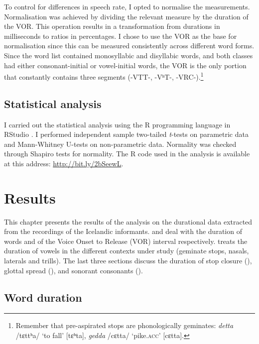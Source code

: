 \documentclass[11pt,a4paper,oneside,openany]{memoir}\usepackage[]{graphicx}\usepackage[]{color}
\begin{document}
To control for differences in speech rate, I opted to normalise the measurements.
Normalisation was achieved by dividing the relevant measure by the duration of the VOR.
This operation results in a transformation from durations in milliseconds to ratios in percentages.
I chose to use the VOR as the base for normalisation since this can be measured consistently across different word forms.
Since the word list contained monosyllabic and disyllabic words, and both classes had either consonant-initial or vowel-initial words, the VOR is the only portion that constantly contains three segments (-VTT-, -VʰT-, -VRC-).\footnote{Remember that pre-aspirated stops are phonologically geminates: \textit{detta} /tɛttʰa/ `to fall' [tɛʰta], \textit{gedda} /cɛtta/ `pike.\textsc{acc}' [cɛtta].}

\section{Statistical analysis}
\label{s:stats}
I carried out the statistical analysis using the R programming language \citep{r-core-team2015} in RStudio \citep{rstudio-team2015}.
I performed independent sample two-tailed \textit{t}-tests on parametric data and Mann-Whitney U-tests on non-parametric data.
Normality was checked through Shapiro tests for normality.
The R code used in the analysis is available at this address: \url{http://bit.ly/2bSeewL}.













\chapter{Results}
\label{c:results}

This chapter presents the results of the analysis on the durational data extracted from the recordings of the Icelandic informants.
 and  deal with the duration of words and of the Voice Onset to Release (VOR) interval respectively.
 treats the duration of vowels in the different contexts under study (geminate stops, nasals, laterals and trills).
The last three sections discuss the duration of stop closure (), glottal spread (), and sonorant consonants ().

\section{Word duration}
\label{s:wordduration}
\end{document}
